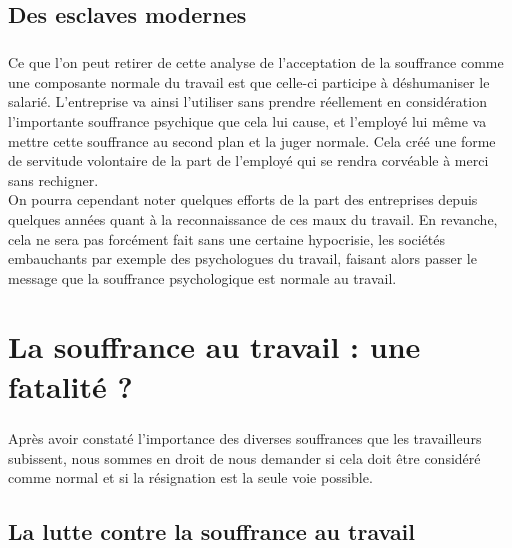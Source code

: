 \documentclass{report}
\begin{document}
	\section*{Des esclaves modernes}
		\paragraph{}
			Ce que l'on peut retirer de cette analyse de l'acceptation de la souffrance comme une composante normale du travail est que celle-ci participe à déshumaniser le salarié. L'entreprise va ainsi l'utiliser sans prendre réellement en considération l'importante souffrance psychique que cela lui cause, et l'employé lui même va mettre cette souffrance au second plan et la juger normale. Cela créé une forme de servitude volontaire de la part de l'employé qui se rendra corvéable à merci sans rechigner. \\
			On pourra cependant noter quelques efforts de la part des entreprises depuis quelques années quant à la reconnaissance de ces maux du travail. En revanche, cela ne sera pas forcément fait sans une certaine hypocrisie, les sociétés embauchants par exemple des psychologues du travail, faisant alors passer le message que la souffrance psychologique est normale au travail.

\chapter{La souffrance au travail : une fatalité ?}
	\paragraph{}
		Après avoir constaté l'importance des diverses souffrances que les travailleurs subissent, nous sommes en droit de nous demander si cela doit être considéré comme normal et si la résignation est la seule voie possible.

	\section{La lutte contre la souffrance au travail}
\end{document}

